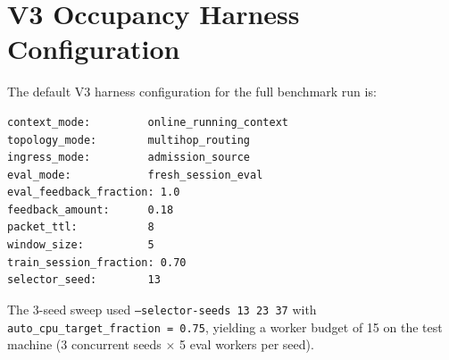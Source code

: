 \documentclass[10pt,twocolumn]{article}
\begin{document}
\section{V3 Occupancy Harness Configuration}
\label{app:v3_config}

The default V3 harness configuration for the full benchmark run is:

\begin{verbatim}
context_mode:         online_running_context
topology_mode:        multihop_routing
ingress_mode:         admission_source
eval_mode:            fresh_session_eval
eval_feedback_fraction: 1.0
feedback_amount:      0.18
packet_ttl:           8
window_size:          5
train_session_fraction: 0.70
selector_seed:        13
\end{verbatim}

The 3-seed sweep used \texttt{--selector-seeds 13 23 37} with
\texttt{auto\_cpu\_target\_fraction = 0.75},
yielding a worker budget of 15 on the test machine
(3 concurrent seeds $\times$ 5 eval workers per seed).
\end{document}
